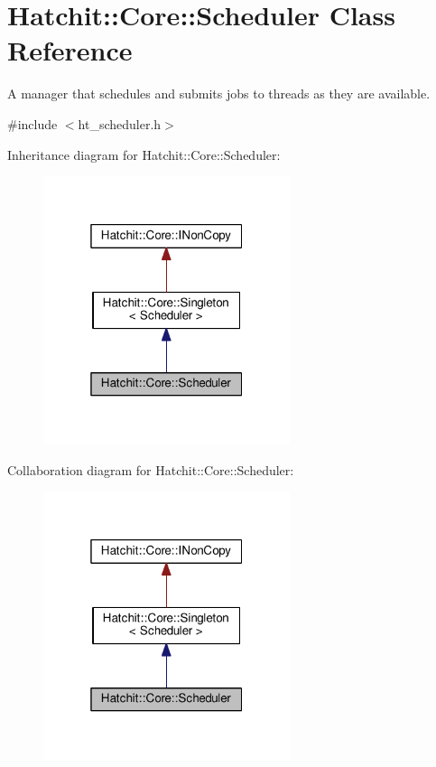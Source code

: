 \hypertarget{classHatchit_1_1Core_1_1Scheduler}{}\section{Hatchit\+:\+:Core\+:\+:Scheduler Class Reference}
\label{classHatchit_1_1Core_1_1Scheduler}


A manager that schedules and submits jobs to threads as they are available.  




{\ttfamily \#include $<$ht\+\_\+scheduler.\+h$>$}



Inheritance diagram for Hatchit\+:\+:Core\+:\+:Scheduler\+:
\nopagebreak
\begin{figure}[H]
\begin{center}
\leavevmode
\includegraphics[width=205pt]{classHatchit_1_1Core_1_1Scheduler__inherit__graph}
\end{center}
\end{figure}


Collaboration diagram for Hatchit\+:\+:Core\+:\+:Scheduler\+:
\nopagebreak
\begin{figure}[H]
\begin{center}
\leavevmode
\includegraphics[width=205pt]{classHatchit_1_1Core_1_1Scheduler__coll__graph}
\end{center}
\end{figure}
